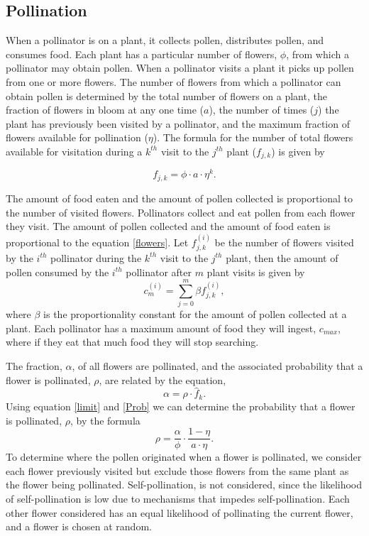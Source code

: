 \subsection{Pollination}

When a pollinator is on a plant, it collects pollen, distributes pollen, and
consumes food. Each plant has a particular number of flowers, $\phi$, from which
a pollinator may obtain pollen. When a pollinator visits a plant it picks up
pollen from one or more flowers. The number of flowers from which a pollinator
can obtain pollen is determined by the total number of flowers on a plant, the
fraction of flowers in bloom at any one time ($a$), the number of times ($j$)
the plant has previously been visited by a pollinator, and the maximum fraction
of flowers available for pollination ($\eta$). The formula for the number of
total flowers available for visitation during a $k^{th}$ visit to the $j^{th}$
plant ($f_{j,k}$) is given by

\begin{equation}\label{flowers}
f_{j,k} = \phi \cdot a \cdot \eta^k.
\end{equation}

The amount of food eaten and the amount of pollen collected is proportional to
the number of visited flowers. Pollinators collect and eat pollen from each
flower they visit.  The amount of pollen collected and the amount of food eaten
is proportional to the equation \eqref{flowers}. Let $f^{\left(i\right)}_{j,k}$
be the number of flowers visited by the $i^{th}$ pollinator during the $k^{th}$
visit to the $j^{th}$ plant, then the amount of pollen consumed by the $i^{th}$
pollinator after $m$ plant visits is given by 
\begin{equation}
  c^{\left(i\right)}_m = \sum_{j=0}^{m} \beta f^{\left(i\right)}_{j,k},
  \label{limit} 
\end{equation} 
where $\beta$ is the proportionality constant for
the amount of pollen collected at a plant.  Each pollinator has a maximum amount
of food they will ingest, $c_{max}$, where if they eat that much food they will
stop searching. 

The fraction, $\alpha$, of all flowers are pollinated, and the associated
probability that a flower is pollinated, $\rho$, are related by the equation,
\begin{equation} \label{Prob}
  \alpha = \rho \cdot \hat{f}_k.
\end{equation}
Using equation \eqref{limit} and \eqref{Prob} we can determine the probability
that a flower is pollinated, $\rho$, by the formula
\begin{equation*}
  \rho = \frac{\alpha}{\phi} \cdot \frac{1 - \eta}{a \cdot \eta}.
\end{equation*}
To determine where the pollen originated when a flower is pollinated, we
consider each flower previously visited but exclude those flowers from the same
plant as the flower being pollinated.    Self-pollination, is not considered,
since the likelihood of self-pollination is low due to mechanisms that impedes
self-pollination. Each other flower considered has an equal likelihood of
pollinating the current flower, and a flower is chosen at random.

